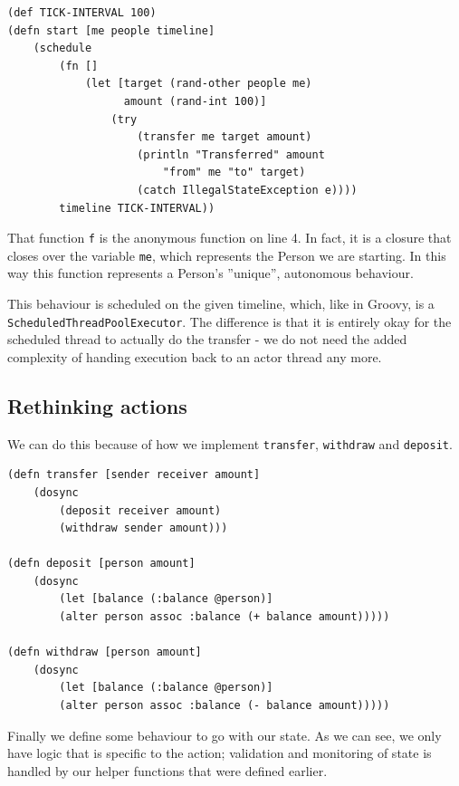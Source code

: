 \documentclass[a4paper,12pt]{kth-mag}
\begin{document}
\begin{listing}[H]
	\begin{verbatim}
(def TICK-INTERVAL 100) 
(defn start [me people timeline]
    (schedule
        (fn [] 
            (let [target (rand-other people me)
                  amount (rand-int 100)]
                (try 
                    (transfer me target amount)
                    (println "Transferred" amount 
                        "from" me "to" target)
                    (catch IllegalStateException e))))
        timeline TICK-INTERVAL))
	\end{verbatim}
\end{listing}

That function \texttt{f} is the anonymous function on line 4. In fact, it is a closure that closes over the variable \texttt{me}, which represents the Person we are starting. In this way this function represents a Person's ''unique'', autonomous behaviour. 

This behaviour is scheduled on the given timeline, which, like in Groovy, is a \texttt{ScheduledThreadPoolExecutor}. The difference is that it is entirely okay for the scheduled thread to actually do the transfer - we do not need the added complexity of handing execution back to an actor thread any more.

\subsection{Rethinking actions}

We can do this because of how we implement \texttt{transfer}, \texttt{withdraw} and \texttt{deposit}.

\begin{listing}[H]
	\begin{verbatim}
(defn transfer [sender receiver amount]
    (dosync
        (deposit receiver amount)
        (withdraw sender amount)))

(defn deposit [person amount]
    (dosync
        (let [balance (:balance @person)]
        (alter person assoc :balance (+ balance amount)))))

(defn withdraw [person amount]
    (dosync
        (let [balance (:balance @person)]
        (alter person assoc :balance (- balance amount)))))
	\end{verbatim}
\end{listing}

Finally we define some behaviour to go with our state. As we can see, we only have logic that is specific to the action; validation and monitoring of state is handled by our helper functions that were defined earlier.
\end{document}

